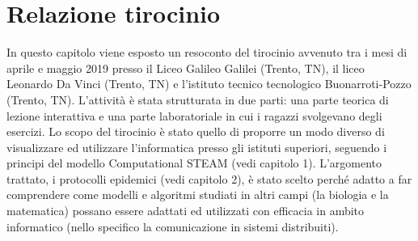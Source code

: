 \chapter{Relazione tirocinio}
\label{cha:conclusioni}


In questo capitolo viene esposto un resoconto del tirocinio avvenuto tra i mesi di aprile e maggio 2019 presso il Liceo Galileo Galilei (Trento, TN), il liceo Leonardo Da Vinci (Trento, TN) e l’istituto tecnico tecnologico Buonarroti-Pozzo (Trento, TN). L’attività è stata strutturata in due parti: una parte teorica di lezione interattiva e una parte laboratoriale in cui i ragazzi svolgevano degli esercizi. Lo scopo del tirocinio è stato quello di proporre un modo diverso di visualizzare ed utilizzare l’informatica presso gli istituti superiori, seguendo i principi del modello Computational STEAM (vedi capitolo 1). L’argomento trattato, i protocolli epidemici (vedi capitolo 2), è stato scelto perché adatto a far comprendere come modelli e algoritmi studiati in altri campi (la biologia e la matematica) possano essere adattati ed utilizzati con efficacia in ambito informatico (nello specifico la comunicazione in sistemi distribuiti).
